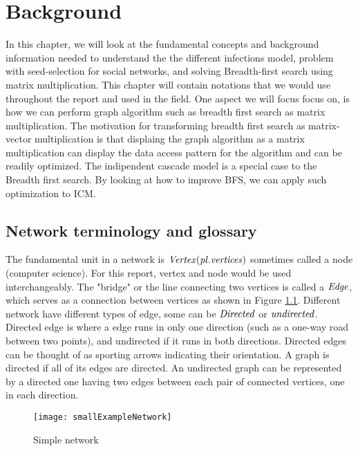 \chapter{Background}

In this chapter, we will look at the fundamental concepts and background information needed to understand the the different infections model, problem with seed-selection for social networks, and solving Breadth-first search using matrix multiplication. This chapter will contain notations that we would use throughout the report and used in the field. One aspect we will focus focus on, is how we can perform graph algorithm such as breadth first search as matrix multiplication. The motivation for transforming breadth first search as matrix-vector multiplication is that displaing the graph algorithm as a matrix multiplication can display the data access pattern for the algorithm and can be readily optimized\cite{AlgoToMath}. The indipendent cascade model is a special case to the Breadth first search\cite{HybridBFS2015}. By looking at how to improve BFS, we can apply such optimization to ICM. 


\section{Network terminology and glossary}
The fundamental unit in a network is $\it{{Vertex}} (pl. vertices)$ sometimes called a node (computer science). For this report, vertex and node would be used interchangeably. The "bridge" or the line connecting two vertices is called a $\it{{Edge}}$, which serves as a connection between vertices as shown in Figure \ref{fig:SimpleGraph}.  Different network have different types of edge, some can be $\it{Directed}$ or $\it{undirected}$. Directed edge is where a edge  runs in only one direction (such as a one-way road between two points), and undirected if it runs in both directions. Directed edges can be thought of as sporting arrows indicating their orientation. A graph is directed if all of its edges are directed. An undirected graph can be represented by a directed one having two edges between each pair of connected vertices, one in each direction.

\begin{figure}[!ht]
	\texttt{[image: smallExampleNetwork]}
	\caption{Simple network} 
	\label{fig:SimpleGraph}
\end{figure}


